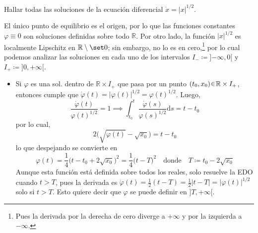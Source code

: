 \begin{ejer}
Hallar todas las soluciones de la ecuación diferencial
$
    \dot{x} = |x|^{1/2}.
$
\end{ejer}
\begin{sol}
El único punto de equilibrio es el origen, por lo que las funciones constantes $\varphi \equiv 0$ son soluciones definidas sobre todo $\mathbb{R}$. Por otro lado, la función $|x|^{1/2}$ es localmente Lipschitz en $\mathbb{R}\setminus\set0$; sin embargo, no lo es en cero,\footnote{Pues la derivada por la derecha de cero diverge a $+\infty$ y por la izquierda a $-\infty$.} por lo cual podemos analizar las soluciones en cada uno de los intervalos $I_- \coloneq {]{-\infty},0[}$ y $I_+ \coloneq {]0, +\infty[}$.
\begin{itemize}
    \item Si $\varphi$ es una sol. dentro de $\mathbb{R} \times I_+$ que pasa por un punto $(t_0,x_0) \en \mathbb{R} \times I_+$, entonces cumple que $\dot\varphi(t) = |\varphi(t)|^{1/2} = \varphi(t)^{1/2}$. Luego,
    \[
        \frac{\dot\varphi(t)}{\varphi(t)^{1/2}} = 1%
        \implies%
        \int^{t}_{t_0} \frac{\dot\varphi(s)}{\varphi(s)^{1/2}}\mathrm{d}s = t - t_0
    \]
    por lo cual, 
    \[
        2\big(%
            \sqrt{\varphi(t)} - \sqrt{x_0}
        \big) = t - t_0
    \]
    lo que despejando se convierte en
    \[
        \varphi(t)%
        = \frac14 \big(%
            t - t_0 + 2\sqrt{x_0}
        \big)^2%
        = \frac14 \big(%
            t - T
        \big)^2%
        \quad\text{donde}\quad%
        T \coloneq t_0 - 2\sqrt{x_0}
    \]
    Aunque esta función está definida sobre todos los reales, solo resuelve la EDO cuando $t > T$, pues la derivada es $\dot\varphi(t) = \frac12 (t-T) = \frac12|t-T| = |\varphi(t)|^{1/2}$ solo si $t > T$. Esto quiere decir que $\varphi$ se puede definir en $]T, +\infty[$.


\end{itemize}
\end{sol}
